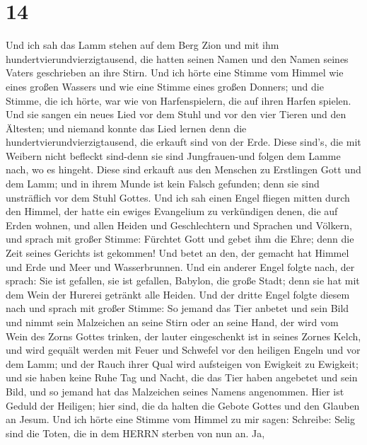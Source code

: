 \hypertarget{section-13}{%
\section{14}\label{section-13}}

 Und ich sah das Lamm stehen auf dem Berg Zion und mit ihm
hundertvierundvierzigtausend, die hatten seinen Namen und den Namen
seines Vaters geschrieben an ihre Stirn.  Und ich hörte eine
Stimme vom Himmel wie eines großen Wassers und wie eine Stimme eines
großen Donners; und die Stimme, die ich hörte, war wie von
Harfenspielern, die auf ihren Harfen spielen.  Und sie
sangen ein neues Lied vor dem Stuhl und vor den vier Tieren und den
Ältesten; und niemand konnte das Lied lernen denn die
hundertvierundvierzigtausend, die erkauft sind von der Erde.
 Diese sind's, die mit Weibern nicht befleckt sind-denn sie
sind Jungfrauen-und folgen dem Lamme nach, wo es hingeht. Diese sind
erkauft aus den Menschen zu Erstlingen Gott und dem Lamm; 
und in ihrem Munde ist kein Falsch gefunden; denn sie sind unsträflich
vor dem Stuhl Gottes.  Und ich sah einen Engel fliegen
mitten durch den Himmel, der hatte ein ewiges Evangelium zu verkündigen
denen, die auf Erden wohnen, und allen Heiden und Geschlechtern und
Sprachen und Völkern,  und sprach mit großer Stimme:
Fürchtet Gott und gebet ihm die Ehre; denn die Zeit seines Gerichts ist
gekommen! Und betet an den, der gemacht hat Himmel und Erde und Meer und
Wasserbrunnen.  Und ein anderer Engel folgte nach, der
sprach: Sie ist gefallen, sie ist gefallen, Babylon, die große Stadt;
denn sie hat mit dem Wein der Hurerei getränkt alle Heiden. 
Und der dritte Engel folgte diesem nach und sprach mit großer Stimme: So
jemand das Tier anbetet und sein Bild und nimmt sein Malzeichen an seine
Stirn oder an seine Hand,  der wird vom Wein des Zorns
Gottes trinken, der lauter eingeschenkt ist in seines Zornes Kelch, und
wird gequält werden mit Feuer und Schwefel vor den heiligen Engeln und
vor dem Lamm;  und der Rauch ihrer Qual wird aufsteigen von
Ewigkeit zu Ewigkeit; und sie haben keine Ruhe Tag und Nacht, die das
Tier haben angebetet und sein Bild, und so jemand hat das Malzeichen
seines Namens angenommen.  Hier ist Geduld der Heiligen;
hier sind, die da halten die Gebote Gottes und den Glauben an Jesum.
 Und ich hörte eine Stimme vom Himmel zu mir sagen:
Schreibe: Selig sind die Toten, die in dem HERRN sterben von nun an. Ja,
